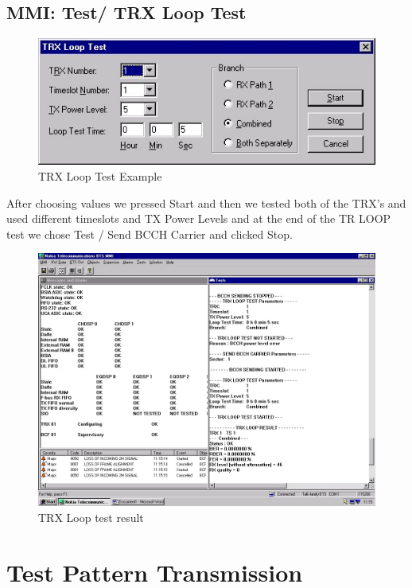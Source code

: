 \documentclass[english]{article}
\begin{document}
\subsection{MMI: Test/ TRX Loop Test}
\begin{figure}
\centerline{\includegraphics[scale=1]{GSM/Pic8}}
\caption{TRX Loop Test Example}
\end{figure}
After choosing values we pressed Start and then we tested both of the TRX’s and used different timeslots and TX Power Levels and at the end of the TR LOOP test we chose Test / Send BCCH Carrier and clicked Stop.
\begin{figure}
\centerline{\includegraphics[scale=0.4]{GSM/Pic9}}
\caption{TRX Loop test result}
\end{figure}
\section{Test Pattern Transmission}
\end{document}
